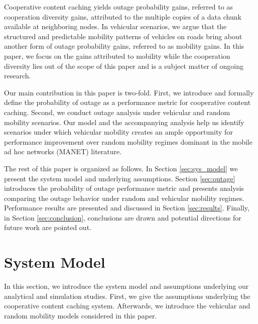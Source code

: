 \documentclass[conference,a4paper]{IEEEtran}
\begin{document}
Cooperative content caching yields outage probability gains, referred to as cooperation diversity gains, attributed to the multiple copies of a data chunk available at neighboring nodes. In vehicular scenarios, we argue that the structured and predictable mobility patterns of vehicles on roads bring about another form of outage probability gains, referred to as mobility gains. In this paper, we focus on the gains attributed to mobility while the cooperation diversity lies out of the scope of this paper and is a subject matter of  ongoing research.

Our main contribution in this paper is two-fold. First, we introduce and formally define the probability of outage as a performance metric for cooperative content caching. Second, we conduct outage analysis under vehicular and random mobility scenarios. Our model and the accompanying analysis help us identify scenarios under which vehicular mobility creates an ample opportunity for performance improvement over random mobility regimes dominant in the mobile ad hoc networks (MANET) literature.

The rest of this paper is organized as follows. In Section \ref{sec:sys_model} we present the system model and underlying assumptions. Section \ref{sec:outage} introduces the probability of outage performance metric and presents analysis comparing the outage behavior under random and vehicular mobility regimes. Performance results are presented and discussed in Section \ref{sec:results}. Finally, in Section \ref{sec:conclusion}, conclusions are drawn and potential directions for future work are pointed out.

\section{System Model \label{sec:sys_model}}
In this section, we introduce the system model and assumptions underlying our analytical and simulation studies. First, we give the assumptions underlying the cooperative content caching system. Afterwards, we introduce the vehicular and random mobility models considered in this paper.
\end{document}

